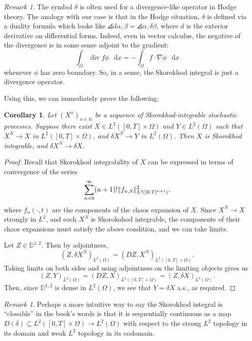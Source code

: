 \documentclass[11pt, a4paper, twoside]{book}
\theoremstyle{plain}
\newtheorem{corollary}[theorem]{Corollary}
\theoremstyle{definition}
\theoremstyle{remark}
\newtheorem{remark}[theorem]{Remark}
\renewcommand{\d}{\mathop{}\!\mathrm{d}}
\newcommand{\bbD}{\mathbb{D}}
\newcommand{\bbN}{\mathbb{N}}
\DeclarePairedDelimiter{\angles}{\langle}{\rangle}
\DeclarePairedDelimiter{\norm}{\lVert}{\rVert}
\DeclareMathOperator\diverg{div}
\begin{document}
\begin{remark}
	The symbol $\delta$ is often used for a divergence-like operator in Hodge
	theory. The analogy with our case is that in the Hodge situation, $\delta$
	is defined via a duality formula which looks like $\angles{d{\alpha},
			\beta} = \angles{\alpha, \delta{\beta}}$, where $d$ is the exterior
	derivative on differential forms. Indeed, even in vector calculus, the
	negative of the divergence is in some sense adjoint to the gradient:
	\[
		\int_\Omega \diverg{f} \phi \, \d{x}
		= - \int_\Omega f \cdot \nabla{\phi} \, \d{x}
	\]
	whenever $\phi$ has zero boundary. So, in a sense, the Skorokhod integral is
	just a divergence operator.
\end{remark}

Using this, we can immediately prove the following:

\begin{corollary}
	Let $(X^n)_{n \in \bbN}$ be a sequence of Skorokhod-integrable stochastic
	processes. Suppose there exist $X \in L^2([0,T]\times\Omega)$ and $Y
		\in L^2(\Omega)$ such that $X^N \to X$ in $L^2([0,T]\times\Omega)$, and
	$\delta{X^N} \to Y$ in $L^2(\Omega)$. Then $X$ is Skorokhod integrable, and
	$\delta{X^N} \to \delta{X}$.
\end{corollary}
\begin{proof}
	Recall that Skorokhod integrability of $X$ can be expressed in terms of
	convergence of the series
	\[
		\sum_{n = 0}^\infty
		(n + 1)! \norm{{f}_{n,S}}_{L^2([0, T]^{n + 1})}^2,
	\]
	where $f_n(\cdot, t)$ are the components of the chaos expansion of $X$.
	Since $X^N \to X$ strongly in $L^2$, and each $X^N$ is Skorokohod
	integrable, the components of their chaos expansions must satisfy the above
	condition, and we can take limits.

	Let $Z \in \bbD^{1, 2}$. Then by adjointness,
	\[
		(Z, \delta{X^N})_{L^2(\Omega)}
		= (DZ, X^N)_{L^2([0,T]\times\Omega)}.
	\]
	Taking limits on both sides and using adjointness on the limiting
	objects gives us
	\[
		(Z, Y)_{L^2(\Omega)}
		= (DZ, X)_{L^2([0,T]\times\Omega)}
		= (Z, \delta{X})_{L^2(\Omega)}.
	\]
	Then, since $\bbD^{1, 2}$ is dense in $L^2(\Omega)$, we see that $Y =
		\delta{X}$ a.s., as required.
\end{proof}

\begin{remark}
	Perhaps a more intuitive way to say the Skorokhod integral is ``closable''
	in the book's words is that it is sequentially continuous as a map
	$D(\delta) \subseteq L^2([0,T]\times\Omega) \to L^2(\Omega)$ with
	respect to the strong $L^2$ topology in its domain and weak $L^2$ topology
	in its codomain.
\end{remark}
\end{document}
